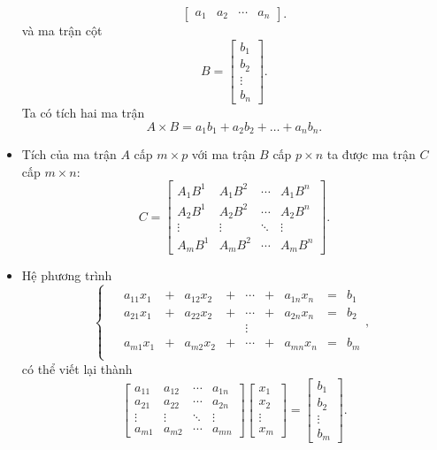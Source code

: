 \documentclass[12pt,a4paper]{report}
\begin{document}
\begin{itemize}
\begin{equation*}
\begin{bmatrix}
	a_1 & a_2 & \cdots & a_n
	\end{bmatrix}.
\end{equation*}
và ma trận cột
\begin{equation*}
B = \begin{bmatrix}
        b_1 \\
        b_2 \\
        \vdots \\
        b_n
	\end{bmatrix}.
\end{equation*}
Ta có tích hai ma trận
\begin{equation*}
A\times B = a_1b_1 + a_2b_2 + \ldots + a_nb_n.
\end{equation*}
\item Tích của ma trận $A$ cấp $m \times p$ với ma trận $B$ cấp $p \times n$ ta được ma trận $C$ cấp $m \times n$:
\begin{equation*}
C = \begin{bmatrix}
        A_1B^1 & A_1B^2 & \cdots & A_1B^n  \\
		A_2B^1 & A_2B^2 & \cdots & A_2B^n \\
		\vdots & \vdots & \ddots & \vdots \\
		A_mB^1 & A_mB^2 & \cdots & A_mB^n
	\end{bmatrix}.
\end{equation*}
\item Hệ phương trình
\begin{equation*}
\left\{\begin{split}
\begin{matrix}
& a_{11}x_1 & + & a_{12}x_2 & + & \cdots & + & a_{1n}x_n & = & b_1 \\
& a_{21}x_1 & + & a_{22}x_2 & + & \cdots & + & a_{2n}x_n & = & b_2 \\
&&&&& \vdots \\
& a_{m1}x_1 & + & a_{m2}x_2 & + & \cdots & + & a_{mn}x_n & = & b_m \\
\end{matrix},
\end{split}\right.  
\end{equation*}
có thể viết lại thành
\begin{equation}
\begin{bmatrix}
	a_{11} & a_{12} & \cdots & a_{1n} \\
	a_{21} & a_{22} & \cdots & a_{2n} \\
	\vdots & \vdots & \ddots & \vdots \\
	a_{m1} & a_{m2} & \cdots & a_{mn} 
\end{bmatrix}
\begin{bmatrix}
	x_1 \\
	x_2 \\
	\vdots \\
	x_m
\end{bmatrix}
=
\begin{bmatrix}
	b_1 \\
	b_2 \\
	\vdots \\
	b_m
\end{bmatrix}.
\end{equation}


\end{itemize}
\end{document}
